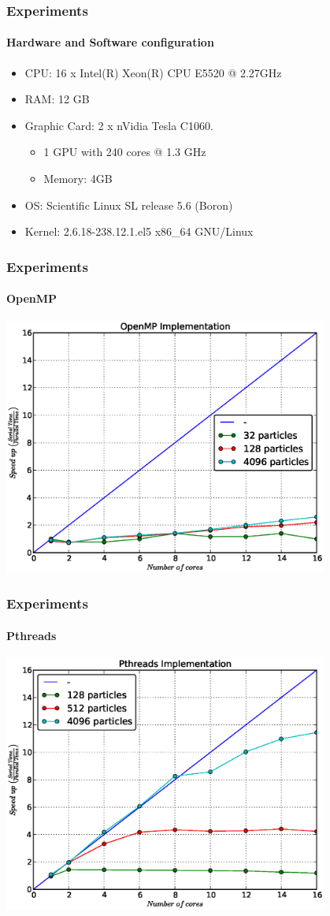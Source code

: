 \frame
{
\frametitle{Experiments}
\framesubtitle{Hardware and Software configuration}
\begin{itemize}
    \item CPU: 16 x Intel(R) Xeon(R) CPU E5520  @ 2.27GHz
    \item RAM: 12 GB
    \item Graphic Card: 2 x nVidia Tesla C1060.
    \begin{itemize}
        \item 1 GPU with 240 cores @ 1.3 GHz
        \item Memory: 4GB
    \end{itemize}
    \item OS: Scientific Linux SL release 5.6 (Boron)
    \item Kernel: 2.6.18-238.12.1.el5 x86\_64 GNU/Linux
\end{itemize}
}


\frame
{
\frametitle{Experiments}
\framesubtitle{OpenMP}
\begin{center}
    \includegraphics[width=0.8\textwidth]{img/openmp}
\end{center}
}

\frame
{
\frametitle{Experiments}
\framesubtitle{Pthreads}
\begin{center}
    \includegraphics[width=0.8\textwidth]{img/pthreads}
\end{center}
}

